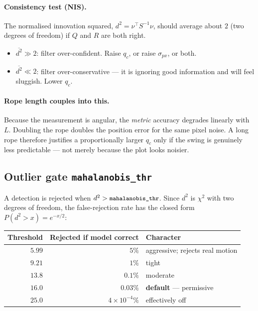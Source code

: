 \documentclass[11pt,a4paper]{article}
\newcommand{\param}[1]{\texttt{\small #1}}
\begin{document}
\paragraph{Consistency test (NIS).} The normalised innovation squared,
$d^2=\nu^\top S^{-1}\nu$, should average about $2$ (two degrees of freedom) if
$Q$ and $R$ are both right.
%
\begin{itemize}[nosep]
  \item $\overline{d^2}\gg 2$: filter over-confident. Raise $q_c$, or raise
        $\sigma_{px}$, or both.
  \item $\overline{d^2}\ll 2$: filter over-conservative --- it is ignoring good
        information and will feel sluggish. Lower $q_c$.
\end{itemize}

\paragraph{Rope length couples into this.} Because the measurement is angular,
the \emph{metric} accuracy degrades linearly with $L$. Doubling the rope
doubles the position error for the same pixel noise. A long rope therefore
justifies a proportionally larger $q_c$ only if the swing is genuinely less
predictable --- not merely because the plot looks noisier.

\subsection{Outlier gate \param{mahalanobis\_thr}}

A detection is rejected when $d^2 > \param{mahalanobis\_thr}$. Since $d^2$ is
$\chi^2$ with two degrees of freedom, the false-rejection rate has the closed
form $P(d^2>x)=e^{-x/2}$:

\begin{center}
\begin{tabular}{@{}rrl@{}}
\toprule
\textbf{Threshold} & \textbf{Rejected if model correct} & \textbf{Character} \\
\midrule
$5.99$  & $5\%$      & aggressive; rejects real motion \\
$9.21$  & $1\%$      & tight \\
$13.8$  & $0.1\%$    & moderate \\
$16.0$  & $0.03\%$   & \textbf{default} --- permissive \\
$25.0$  & $4\times10^{-4}\%$ & effectively off \\
\bottomrule
\end{tabular}
\end{center}
\end{document}
